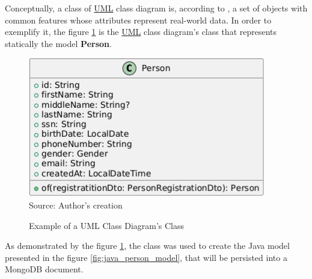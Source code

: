 Conceptually, a class of \hyperref[appendix:glossary]{UML} class diagram is, according to \cite{BERARDI200570, vo2020transformation}, a set of objects with 
common features whose attributes represent real-world data. In order to exemplify it, the figure \ref{fig:person_class} is the \hyperref[appendix:glossary]{UML} class diagram's class that represents statically the model \textbf{Person}. 

\begin{figure}[H]
    \caption{Example of a UML Class Diagram's Class}
    \centering
    \includegraphics[width=0.87\linewidth]{figures/api/person_class.png}
    \label{fig:person_class}
    \\ \footnotesize Source: Author's creation
\end{figure}

As demonstrated by the figure \ref{fig:person_class}, the class was used to create the Java model presented in the figure \ref{fig:java_person_model}, that will be persisted into a MongoDB document. 

